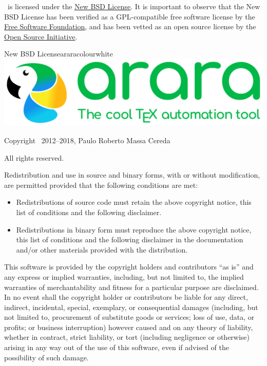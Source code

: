 \documentclass[a4paper,twoside,12pt]{memoir}
\begin{document}
\arara\ is licensed under the \href{http://www.opensource.org/licenses/bsd-license.php}{New BSD License}. It is important to observe that the New BSD License has been verified as a GPL-compatible free software license by the \href{http://www.fsf.org/}{Free Software Foundation}, and has been vetted as an open source license by the \href{http://www.opensource.org/}{Open Source Initiative}.

\vfill

\begin{messagebox}{New BSD License}{araracolour}{\icinfo}{white}
\includegraphics[scale=0.25]{../logos/logo1.pdf}

\vspace{1em}

Copyright \textcopyright\ 2012--2018, Paulo Roberto Massa Cereda

All rights reserved.

\vspace{1em}

Redistribution and use in source and binary forms, with or without modification, are permitted provided that the following conditions are met:

\begin{itemize}
\item Redistributions of source code must retain the above copyright notice, this list of conditions and the following disclaimer.
\item Redistributions in binary form must reproduce the above copyright notice, this list of conditions and the following disclaimer in the documentation and/or other materials provided with the distribution.
\end{itemize}

This software is provided by the copyright holders and contributors ``as is'' and any express or implied warranties, including, but not limited to, the implied warranties of merchantability and fitness for a particular purpose are disclaimed. In no event shall the copyright holder or contributors be liable for any direct, indirect, incidental, special, exemplary, or consequential damages (including, but not limited to, procurement of substitute goods or services; loss of use, data, or profits; or business interruption) however caused and on any theory of liability, whether in contract, strict liability, or tort (including negligence or otherwise) arising in any way out of the use of this software, even if advised of the possibility of such damage.
\end{messagebox}
\end{document}
